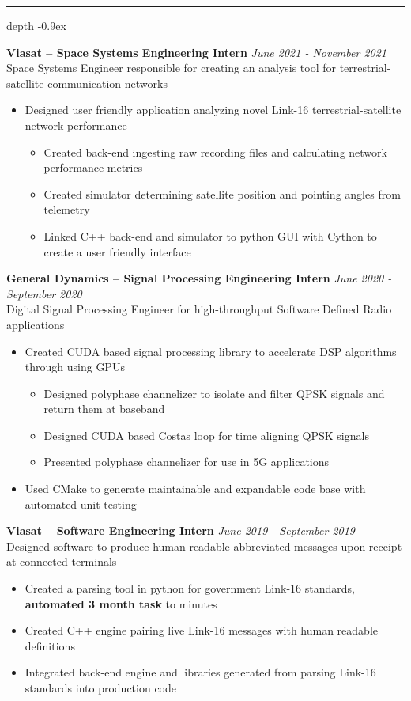 \documentclass[11pt, letterpaper]{article}
\newcommand\smallspace{4pt}
\newcommand\indentlength{0.25in}
\def\Vhrulefill{\leavevmode\leaders\hrule height 1ex depth \dimexpr0.1pt-0.9ex\hfill\kern0pt}
\newenvironment{category}[1]
{
	\vspace{\smallspace}
	\noindent {\LARGE{\sc{#1}}} \hspace{2pt}
	\Vhrulefill
	\vspace{\smallspace}
	\begin{addmargin}[\indentlength]{0in}
	}
	{
	\end{addmargin}
	\vspace{\smallspace}
}
\newenvironment{experience}[4][3]{
	\vspace{\smallspace}
	\noindent\textbf{#2}
	\hfill \textit{#3} \\
	#4
	\vspace{\smallspace}
	\begin{itemize}
	}
	{
	\end{itemize}
	\vspace{\smallspace}
}
\begin{document}
	\begin{category}{Work Experience}
		\begin{experience}{Viasat -- Space Systems Engineering Intern}{June 2021 - November 2021}{Space Systems Engineer responsible for creating an analysis tool for terrestrial-satellite communication networks \hspace{-10pt}}
			\item Designed user friendly application analyzing novel Link-16 terrestrial-satellite network performance 
			\begin{itemize}
				\item Created back-end ingesting raw recording files and calculating network performance metrics
				\item Created simulator determining satellite position and pointing angles from telemetry 
				\item Linked C++ back-end and simulator to python GUI with Cython to create a user friendly interface
			\end{itemize}

		\end{experience}
		
		\begin{experience}{General Dynamics -- Signal Processing Engineering Intern}{June 2020 - September 2020}{Digital Signal Processing Engineer for high-throughput Software Defined Radio applications}
			\item Created CUDA based signal processing library to accelerate DSP algorithms through using GPUs
			\begin{itemize}[noitemsep,nolistsep]
				\item Designed polyphase channelizer to isolate and filter QPSK signals and return them at baseband
				\item Designed CUDA based Costas loop for time aligning QPSK signals
				\item Presented polyphase channelizer for use in 5G applications
			\end{itemize}
			\item Used CMake to generate maintainable and expandable code base with automated unit testing
		\end{experience}
		
		\begin{experience}{Viasat -- Software Engineering Intern}{June 2019 - September 2019}{Designed software to produce  human readable abbreviated  messages upon receipt at connected terminals}
			\item Created a parsing tool in python for government Link-16 standards, \textbf{automated 3 month task} to minutes
			\item Created C++ engine pairing live Link-16 messages with human readable definitions
			\item Integrated back-end engine and libraries generated from parsing Link-16 standards into production code
		\end{experience}
	\end{category}
	
\end{document}
